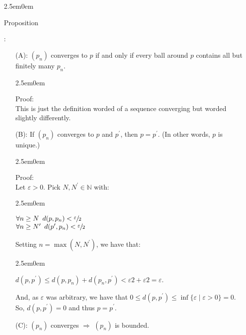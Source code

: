 \documentclass{book}
\newcommand{\hTwo}{%
   \color{MidnightBlue}%
   \fontsize{13}{15}\selectfont%
}
\newcommand{\hThree}{%
   \color{PineGreen}
   \fontsize{13}{15}\selectfont%
}
\newenvironment{myIndent}{%
   \begin{adjustwidth}{2.5em}{0em}%
}{%
   \end{adjustwidth}%
}
\newcommand{\retTwo}{\hfill\bigbreak}
\newcommand{\pprime}{\prime\prime}
\newcounter{PropNumber}
\newcommand{\propCount}[1][1]{%
   \addtocounter{PropNumber}{#1}%
   \thePropNumber%
}
\begin{document}
   {\begin{myIndent}\hTwo
      Proposition \propCount:
      \begin{itemize}
         \item[(A):] $(p_n)$ converges to $p$ if and only if every ball around $p$ contains all but finitely many $p_n$.
            
         {\begin{myIndent} \hThree
            Proof:\\
            This is just the definition worded of a sequence converging but worded slightly differently.
            \retTwo
         \end{myIndent}}

         \item[(B):] If $(p_n)$ converges to $p$ and $p^\prime$, then $p = p^\prime$. (In other words, $p$ is unique.)
         
         {\begin{myIndent} \hThree
            Proof:\\
            Let $\varepsilon > 0$. Pick $N, N^\prime \in \mathbb{N}$ with:
            \begin{myIndent}
               $
               \begin{matrix}
                  \forall n \geq N \hspace{0.5em} d(p, p_n) < \sfrac{\varepsilon}{2}\phantom{\pprime} \\
                  \forall n \geq N^\prime \hspace{0.5em} d(p^\prime, p_n) < \sfrac{\varepsilon}{2}
               \end{matrix}$\retTwo
            \end{myIndent}

            Setting $n = \max(N, N^\prime)$, we have that: 
            \begin{myIndent}
               $d(p, p^\prime) \leq d(p, p_n) + d(p_n, p^\prime) < {\varepsilon}{2} + {\varepsilon}{2} = \varepsilon$.
            \end{myIndent}
            And, as $\varepsilon$ was arbitrary, we have that $0 \leq d(p, p^\prime) \leq \inf{\{\varepsilon \mid \varepsilon > 0\}} = 0$.\\ So, $d(p, p^\prime) = 0$ and thus $p = p^\prime$.
            \retTwo
         \end{myIndent}}

         \item[(C):] $(p_n)$ converges $\Longrightarrow$ $(p_n)$ is bounded.
         

\end{itemize}
\end{myIndent}}
\end{document}
